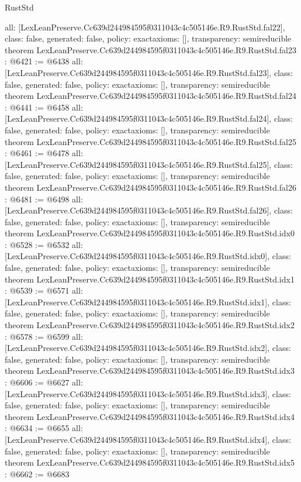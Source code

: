 \begin{lexlean}{RustStd}
\begin{coremodule}
{  all: [LexLeanPreserve.Cc639d244984595f0311043c4c505146e.R9.RustStd.fal22],
  class: false,
  generated: false,
  policy: exact{axioms: []},
  transparency: semireducible
}
theorem LexLeanPreserve.Cc639d244984595f0311043c4c505146e.R9.RustStd.fal23 : @6421 := @6438 {
  all: [LexLeanPreserve.Cc639d244984595f0311043c4c505146e.R9.RustStd.fal23],
  class: false,
  generated: false,
  policy: exact{axioms: []},
  transparency: semireducible
}
theorem LexLeanPreserve.Cc639d244984595f0311043c4c505146e.R9.RustStd.fal24 : @6441 := @6458 {
  all: [LexLeanPreserve.Cc639d244984595f0311043c4c505146e.R9.RustStd.fal24],
  class: false,
  generated: false,
  policy: exact{axioms: []},
  transparency: semireducible
}
theorem LexLeanPreserve.Cc639d244984595f0311043c4c505146e.R9.RustStd.fal25 : @6461 := @6478 {
  all: [LexLeanPreserve.Cc639d244984595f0311043c4c505146e.R9.RustStd.fal25],
  class: false,
  generated: false,
  policy: exact{axioms: []},
  transparency: semireducible
}
theorem LexLeanPreserve.Cc639d244984595f0311043c4c505146e.R9.RustStd.fal26 : @6481 := @6498 {
  all: [LexLeanPreserve.Cc639d244984595f0311043c4c505146e.R9.RustStd.fal26],
  class: false,
  generated: false,
  policy: exact{axioms: []},
  transparency: semireducible
}
theorem LexLeanPreserve.Cc639d244984595f0311043c4c505146e.R9.RustStd.idx0 : @6528 := @6532 {
  all: [LexLeanPreserve.Cc639d244984595f0311043c4c505146e.R9.RustStd.idx0],
  class: false,
  generated: false,
  policy: exact{axioms: []},
  transparency: semireducible
}
theorem LexLeanPreserve.Cc639d244984595f0311043c4c505146e.R9.RustStd.idx1 : @6539 := @6571 {
  all: [LexLeanPreserve.Cc639d244984595f0311043c4c505146e.R9.RustStd.idx1],
  class: false,
  generated: false,
  policy: exact{axioms: []},
  transparency: semireducible
}
theorem LexLeanPreserve.Cc639d244984595f0311043c4c505146e.R9.RustStd.idx2 : @6578 := @6599 {
  all: [LexLeanPreserve.Cc639d244984595f0311043c4c505146e.R9.RustStd.idx2],
  class: false,
  generated: false,
  policy: exact{axioms: []},
  transparency: semireducible
}
theorem LexLeanPreserve.Cc639d244984595f0311043c4c505146e.R9.RustStd.idx3 : @6606 := @6627 {
  all: [LexLeanPreserve.Cc639d244984595f0311043c4c505146e.R9.RustStd.idx3],
  class: false,
  generated: false,
  policy: exact{axioms: []},
  transparency: semireducible
}
theorem LexLeanPreserve.Cc639d244984595f0311043c4c505146e.R9.RustStd.idx4 : @6634 := @6655 {
  all: [LexLeanPreserve.Cc639d244984595f0311043c4c505146e.R9.RustStd.idx4],
  class: false,
  generated: false,
  policy: exact{axioms: []},
  transparency: semireducible
}
theorem LexLeanPreserve.Cc639d244984595f0311043c4c505146e.R9.RustStd.idx5 : @6662 := @6683 {
}
\end{coremodule}
\end{lexlean}
